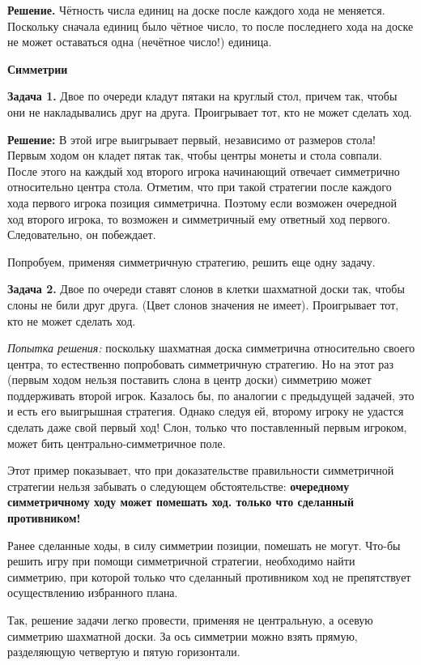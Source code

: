 \textbf{Решение.}
Чётность числа единиц на доске после каждого хода не меняется. Поскольку сначала единиц было чётное число, то после последнего хода на доске не может оставаться одна (нечётное число!) единица.

\textbf{\Large Симметрии}

\textbf{Задача 1.} Двое по очереди кладут пятаки на круглый стол, причем так, чтобы они не накладывались друг на друга. Проигрывает тот, кто не может сделать ход.

\textbf{Решение:} В этой игре выигрывает первый, независимо от размеров стола! Первым ходом он кладет пятак так, чтобы центры монеты и стола совпали. После этого на каждый ход второго игрока начинающий отвечает симметрично относительно центра стола. Отметим, что при такой стратегии после каждого хода первого игрока позиция симметрична. Поэтому если возможен очередной ход второго игрока, то возможен и симметричный ему ответный ход первого. Следовательно, он побеждает.

Попробуем, применяя симметричную стратегию, решить еще одну задачу.

\textbf{Задача 2.} Двое по очереди ставят слонов в клетки шахматной доски так, чтобы слоны не били друг друга. (Цвет слонов значения не имеет). Проигрывает тот, кто не может сделать ход.

\hspace{3mm}

\textit{Попытка решения:} поскольку шахматная доска симметрична относительно своего центра, то естественно попробовать симметричную стратегию. Но на этот раз (первым ходом нельзя поставить слона в центр доски) симметрию может поддерживать второй игрок. Казалось бы, по аналогии с предыдущей задачей, это и есть его выигрышная стратегия. Однако следуя ей, второму игроку не удастся сделать даже свой первый ход! Слон, только что поставленный первым игроком, может бить центрально-симметричное поле.

Этот пример показывает, что при доказательстве правильности симметричной стратегии нельзя забывать о следующем обстоятельстве: \textbf{очередному симметричному ходу может помешать ход. только что сделанный противником!} 

Ранее сделанные ходы, в силу симметрии позиции, помешать не могут. Что-бы решить игру при помощи симметричной стратегии, необходимо найти симметрию, при которой только что сделанный противником ход не препятствует осуществлению избранного плана.

Так, решение задачи легко провести, применяя не центральную, а осевую симметрию шахматной доски. За ось симметрии можно взять прямую, разделяющую четвертую и пятую горизонтали.


